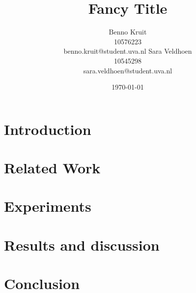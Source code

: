 \documentclass[11pt]{article}
\title{Fancy Title}
\author{Benno Kruit\\10576223\\benno.kruit@student.uva.nl\And
Sara Veldhoen\\10545298\\sara.veldhoen@student.uva.nl}
\date{\today}
\begin{document}
\maketitle


\section{Introduction}\label{s:introduction}

\section{Related Work}\label{s:relatedWork}

\section{Experiments}\label{s:experiments}

\section{Results and discussion}\label{s:results}

\section{Conclusion}\label{s:conclusion}




\end{document}
